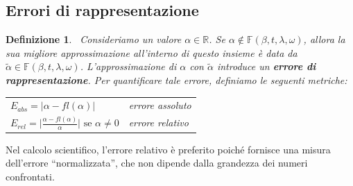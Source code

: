 \documentclass{article}
\newtheorem*{definition}{\color{red}\textbf{Definizione}}
\numberwithin{equation}{section}
\begin{document}
\subsection{Errori di rappresentazione}
\begin{definition}\leavevmode\
    Consideriamo un valore $\alpha\in \mathbb{R}$. Se $\alpha\notin
    \mathbb{F}(\beta,t,\lambda,\omega)$, allora la sua migliore
    approssimazione all'interno di questo insieme è data da $\tilde\alpha\in
    \mathbb{F}(\beta,t,\lambda,\omega)$. L'approssimazione di $\alpha$ con
    $\tilde\alpha$ introduce un \textbf{errore di rappresentazione}. Per quantificare
    tale errore, definiamo le seguenti metriche:
    {
        \renewcommand{\arraystretch}{1.5}
        \begin{center}
           \begin{tabular}{ll}
                $E_{abs}=\lvert \alpha-fl(\alpha)\rvert$ & errore assoluto \\
                $E_{rel}=\lvert \frac{\alpha-fl(\alpha)}{\alpha}\rvert\text{ se
            }\alpha\neq0$ & errore relativo 
           \end{tabular}
        \end{center}
    }
\end{definition}
Nel calcolo scientifico, l'errore relativo è preferito poiché fornisce una
misura dell'errore ``normalizzata'', che non dipende dalla grandezza dei numeri confrontati.
\end{document}
